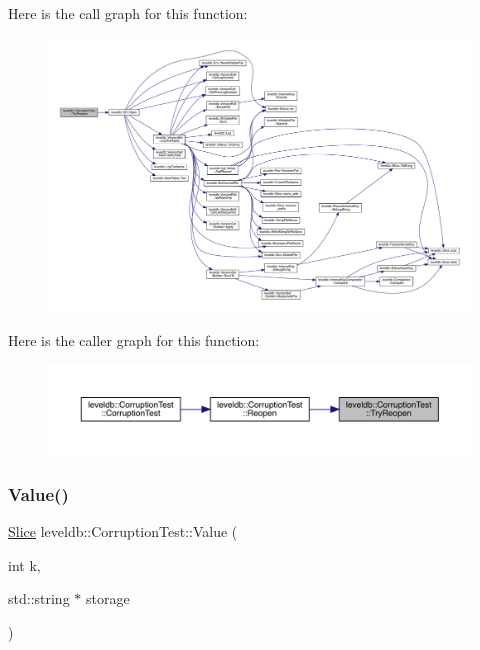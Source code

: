 Here is the call graph for this function\+:
\nopagebreak
\begin{figure}[H]
\begin{center}
\leavevmode
\includegraphics[width=350pt]{classleveldb_1_1_corruption_test_aaba7c05f06400ef45d1af5cb95f66a57_cgraph}
\end{center}
\end{figure}
Here is the caller graph for this function\+:
\nopagebreak
\begin{figure}[H]
\begin{center}
\leavevmode
\includegraphics[width=350pt]{classleveldb_1_1_corruption_test_aaba7c05f06400ef45d1af5cb95f66a57_icgraph}
\end{center}
\end{figure}
\mbox{\label{classleveldb_1_1_corruption_test_a0afb6030faf43287b86e027a13eac152}} 
\subsubsection{\texorpdfstring{Value()}{Value()}}
{\footnotesize\ttfamily \mbox{\hyperlink{classleveldb_1_1_slice}{Slice}} leveldb\+::\+Corruption\+Test\+::\+Value (\begin{DoxyParamCaption}\item[{int}]{k,  }\item[{std\+::string $\ast$}]{storage }\end{DoxyParamCaption})\hspace{0.3cm}{\ttfamily [inline]}}

